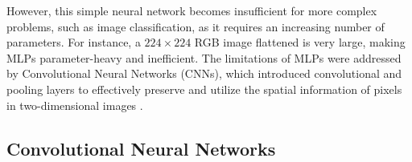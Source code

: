 However, this simple neural network becomes insufficient for more complex problems, such as image classification, as it requires an increasing number of parameters. For instance, a $224\times 224$ RGB image flattened is very large, making MLPs parameter-heavy and inefficient. The limitations of MLPs were addressed by Convolutional Neural Networks (CNNs), which introduced convolutional and pooling layers to effectively preserve and utilize the spatial information of pixels in two-dimensional images \cite{zhang2023dive}.


\subsection{Convolutional Neural Networks}




 

